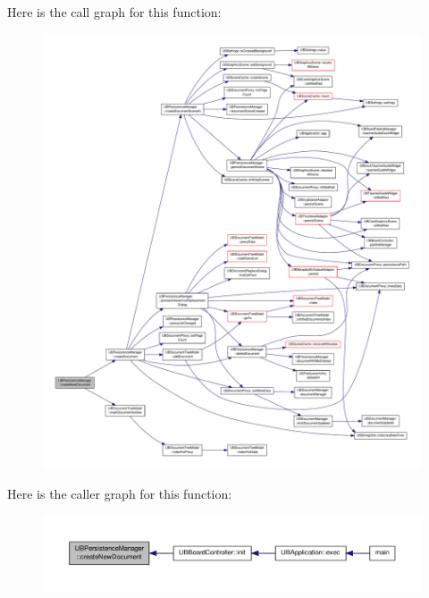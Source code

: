 Here is the call graph for this function\-:
\nopagebreak
\begin{figure}[H]
\begin{center}
\leavevmode
\includegraphics[width=350pt]{d0/dd5/class_u_b_persistence_manager_a0bd236690f1efa4fe856489914a3d92b_cgraph}
\end{center}
\end{figure}




Here is the caller graph for this function\-:
\nopagebreak
\begin{figure}[H]
\begin{center}
\leavevmode
\includegraphics[width=350pt]{d0/dd5/class_u_b_persistence_manager_a0bd236690f1efa4fe856489914a3d92b_icgraph}
\end{center}
\end{figure}


